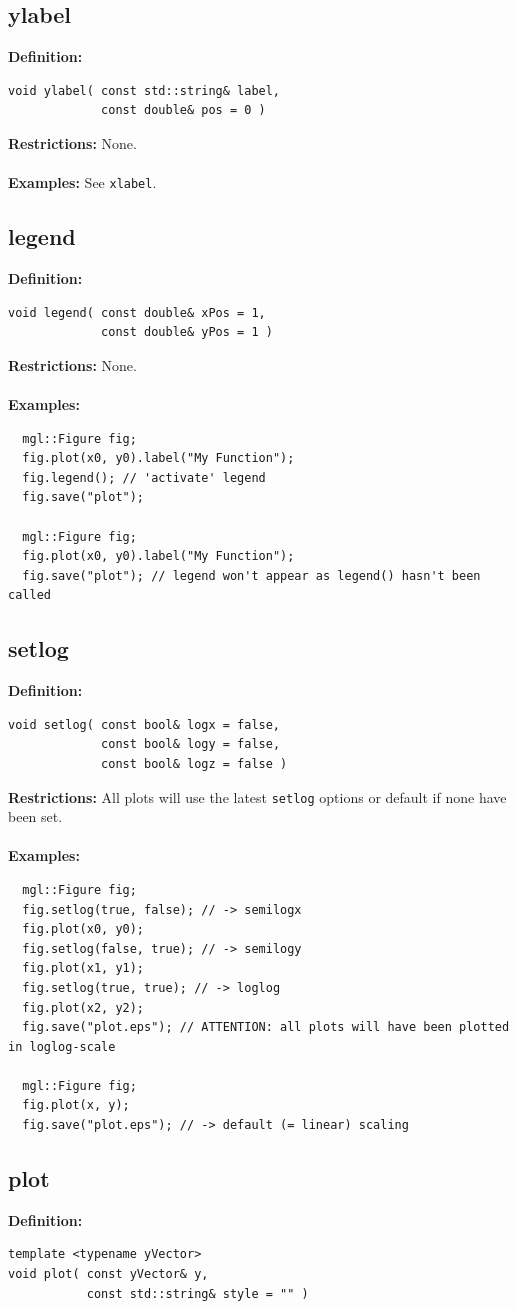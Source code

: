 \documentclass[a4paper]{article}
\newcommand{\command}[1]{\subsection{#1}}
\begin{document}
\newpage
\command{ylabel}

\textbf{Definition:}
\begin{lstlisting}
void ylabel( const std::string& label, 
             const double& pos = 0 )
\end{lstlisting}
%
\textbf{Restrictions:} None. \\ \\
%
\textbf{Examples:} See \texttt{xlabel}.

\command{legend}

\textbf{Definition:}
\begin{lstlisting}
void legend( const double& xPos = 1, 
             const double& yPos = 1 )
\end{lstlisting}
%
\textbf{Restrictions:} None.  \\ \\
%
\textbf{Examples:}
\begin{lstlisting}
  mgl::Figure fig;
  fig.plot(x0, y0).label("My Function");
  fig.legend(); // 'activate' legend 
  fig.save("plot");
  
  mgl::Figure fig;
  fig.plot(x0, y0).label("My Function");
  fig.save("plot"); // legend won't appear as legend() hasn't been called
\end{lstlisting}

\command{setlog}

\textbf{Definition:}
\begin{lstlisting}
void setlog( const bool& logx = false, 
             const bool& logy = false,
             const bool& logz = false )
\end{lstlisting}
%
\textbf{Restrictions:} All plots will use the latest \texttt{setlog} options or default if none have been set. \\ \\
%
\textbf{Examples:}
\begin{lstlisting}
  mgl::Figure fig;
  fig.setlog(true, false); // -> semilogx
  fig.plot(x0, y0); 
  fig.setlog(false, true); // -> semilogy
  fig.plot(x1, y1);
  fig.setlog(true, true); // -> loglog
  fig.plot(x2, y2);
  fig.save("plot.eps"); // ATTENTION: all plots will have been plotted in loglog-scale 

  mgl::Figure fig;
  fig.plot(x, y);
  fig.save("plot.eps"); // -> default (= linear) scaling
\end{lstlisting}

\newpage
\command{plot} 

\textbf{Definition:} 
\begin{lstlisting}
template <typename yVector>
void plot( const yVector& y, 
           const std::string& style = "" )
\end{lstlisting}
\end{document}
